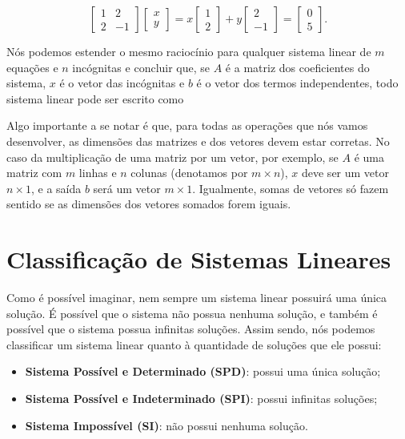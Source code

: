 $$
\begin{bmatrix}
	1 & 2 \\
	2 & -1
\end{bmatrix}
\begin{bmatrix}
	x \\
	y
\end{bmatrix}
=
x\begin{bmatrix}
	1 \\
	2
\end{bmatrix}
+
y\begin{bmatrix}
	2 \\
	-1
\end{bmatrix}
=
\begin{bmatrix}
	0 \\
	5
\end{bmatrix}.
$$

Nós podemos estender o mesmo raciocínio para qualquer sistema linear de $m$ equações e $n$ incógnitas e concluir que, se $A$ é a matriz dos coeficientes do sistema, $x$ é o vetor das incógnitas e $b$ é o vetor dos termos independentes, todo sistema linear pode ser escrito como

\begin{center}
\end{center}

Algo importante a se notar é que, para todas as operações que nós vamos desenvolver, as dimensões das matrizes e dos vetores devem estar corretas. No caso da multiplicação de uma matriz por um vetor, por exemplo, se $A$ é uma matriz com $m$ linhas e $n$ colunas (denotamos por $m\times n$), $x$ deve ser um vetor $n\times 1$, e a saída $b$ será um vetor $m\times 1$. Igualmente, somas de vetores só fazem sentido se as dimensões dos vetores somados forem iguais.

\section{Classificação de Sistemas Lineares}

Como é possível imaginar, nem sempre um sistema linear possuirá uma única solução. É possível que o sistema não possua nenhuma solução, e também é possível que o sistema possua infinitas soluções. Assim sendo, nós podemos classificar um sistema linear quanto à quantidade de soluções que ele possui:

\begin{itemize}
	\item \textbf{Sistema Possível e Determinado (SPD)}: possui uma única solução;
	\item \textbf{Sistema Possível e Indeterminado (SPI)}: possui infinitas soluções;
	\item \textbf{Sistema Impossível (SI)}: não possui nenhuma solução.
\end{itemize}

